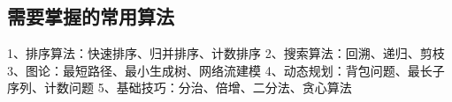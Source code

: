 \documentclass[../../../interview-questions.tex]{subfiles}
\begin{document}
\subsection{需要掌握的常用算法}

1、排序算法：快速排序、归并排序、计数排序
2、搜索算法：回溯、递归、剪枝
3、图论：最短路径、最小生成树、网络流建模
4、动态规划：背包问题、最长子序列、计数问题
5、基础技巧：分治、倍增、二分法、贪心算法
\end{document}
